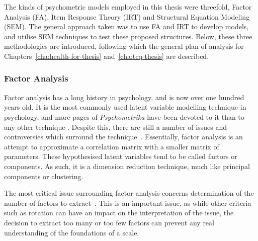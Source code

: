 The kinds of psychometric models employed in this thesis were threefold, Factor Analysis (FA), Item Response Theory (IRT) and Structural Equation Modeling (SEM). The general approach taken was to use FA and IRT to develop models, and utilise SEM techniques to test these proposed structures. Below, these three methodologies are introduced, following which the general plan of analysis for Chapters~\ref{cha:health-for-thesis} and~\ref{cha:tcq-thesis} are described. 

\subsubsection{Factor Analysis}
\label{sec:factor-analysis}
Factor analysis has a long history in psychology, and is now over one hundred years old. It is the most commonly used latent variable modelling technique in psychology, and more pages of \textit{Psychometrika} have been devoted to it than to any other technique \cite{henson2006use}.  Despite this, there are still a number of issues and controversies which surround the technique~\cite{sass2010comparative}.  Essentially, factor analysis is an attempt to approximate a correlation matrix with a smaller matrix of parameters.  These hypothesised latent variables tend to be called factors or components. As such, it is a dimension reduction technique, much like principal components or clustering. 



The most critical issue surrounding factor analysis concerns determination of the number of factors to extract~\cite{zwick1986comparison}.  This is an important issue, as while other criteria such as rotation can have an impact on the interpretation of the issue, the decision to extract too many or too few factors can prevent any real understanding of the foundations of a scale.   


